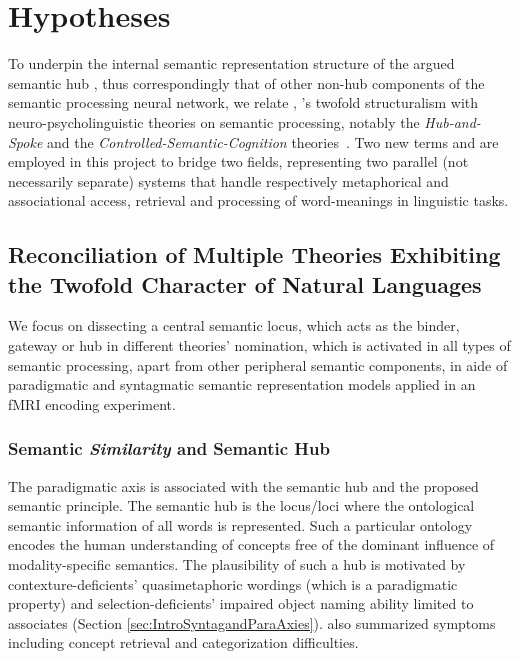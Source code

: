 \chapter{Hypotheses} %
\label{chap:hypotheses} %

To underpin the internal semantic representation structure of the argued semantic hub \parencite{pattersonWhereYouKnow2007}, thus correspondingly that of other non-hub components of the semantic processing neural network, we relate \citeauthor{desaussureCoursLinguistiqueGenerale1969}, \citeauthor{jakobsonFundamentalsLanguage1963}'s twofold structuralism with neuro-psycholinguistic theories on semantic processing, notably the \emph{Hub-and-Spoke} and the \emph{Controlled-Semantic-Cognition} theories~\parencite{ralphNeuralComputationalBases2017}. Two new terms \similarity and \association are employed in this project to bridge two fields, representing two parallel (not necessarily separate) systems that handle respectively metaphorical and associational access, retrieval and processing of word-meanings in linguistic tasks.

\section{Reconciliation of Multiple Theories Exhibiting the Twofold Character of Natural Languages}

We focus on dissecting a central semantic locus, which acts as the binder, gateway or hub in different theories' nomination, which is activated in all types of semantic processing, apart from other peripheral semantic components, in aide of paradigmatic and syntagmatic semantic representation models applied in an fMRI encoding experiment. 

\subsection{Semantic \emph{Similarity} and Semantic Hub} 
\label{subsection:hypsemantichub}


The paradigmatic axis is associated with the semantic hub and the proposed semantic \similarity principle.
The semantic hub is the locus\slash loci where the ontological semantic information of all words is represented.  Such a particular ontology encodes the human understanding of concepts free of the dominant influence of modality-specific semantics. The plausibility of such a hub is motivated by contexture-deficients' quasimetaphoric wordings (which is a paradigmatic property) and selection-deficients' impaired object naming ability limited to associates (Section \ref{sec:IntroSyntagandParaAxies}). \textcite{pattersonWhereYouKnow2007} also summarized symptoms including concept retrieval and categorization difficulties. 


